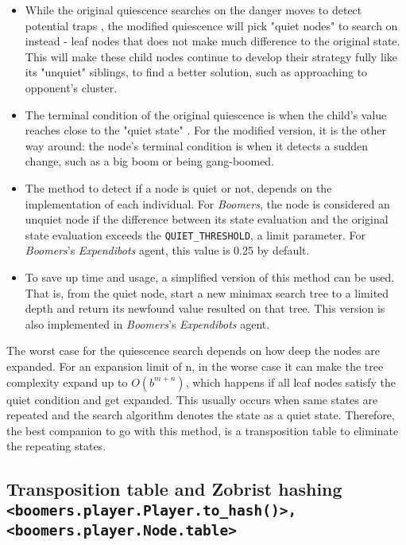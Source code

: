 \documentclass[]{article}
\newcommand{\gameName}{Expendibots}
\begin{document}
\begin{itemize}
    \item While the original quiescence searches on the danger moves to detect potential traps \cite{aima}, the modified quiescence will pick "quiet nodes" to search on instead - leaf nodes that does not make much difference to the original state. This will make these child nodes continue to develop their strategy fully like its "unquiet" siblings, to find a better solution, such as approaching to opponent's cluster.
    \item The terminal condition of the original quiescence is when the child's value reaches close to the "quiet state" \cite{aima}. For the modified version, it is the other way around: the node's terminal condition is when it detects a sudden change, such as a big boom or being gang-boomed.
    \item The method to detect if a node is quiet or not, depends on the implementation of each individual. For \emph{Boomers}, the node is considered an unquiet node if the difference between its state evaluation and the original state evaluation exceeds the \texttt{QUIET\_THRESHOLD}, a limit parameter. For \emph{Boomers}'s \emph{\gameName} agent, this value is 0.25 by default.
    \item To save up time and usage, a simplified version of this method can be used. That is, from the quiet node, start a new minimax search tree to a limited depth and return its newfound value resulted on that tree. This version is also implemented in \emph{Boomers}'s \emph{\gameName} agent.
\end{itemize}

The worst case for the quiescence search depends on how deep the nodes are expanded. For an expansion limit of n, in the worse case it can make the tree complexity expand up to $O(b^{m+n})$, which happens if all leaf nodes satisfy the quiet condition and get expanded. This usually occurs when same states are repeated and the search algorithm denotes the state as a quiet state. Therefore, the best companion to go with this method, is a transposition table to eliminate the repeating states. 

\subsection{Transposition table and Zobrist hashing\\ \texttt{<boomers.player.Player.to\_hash()>,<boomers.player.Node.table>}}
\end{document}
